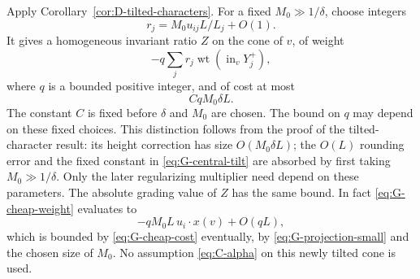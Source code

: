 Apply Corollary~\ref{cor:D-tilted-characters}.  For a fixed
$M_0\gg1/\delta$, choose integers
\begin{equation}\label{eq:G-rounding}
                r_j=M_0u_{ij}L/L_j+O(1).
\end{equation}
It gives a homogeneous invariant ratio $Z$ on the cone of $v$, of weight
\begin{equation}\label{eq:G-cheap-weight}
 -q\sum_jr_j\operatorname{wt}(\operatorname{in}_vY_j^+),
\end{equation}
where $q$ is a bounded positive integer, and of cost at most
\begin{equation}\label{eq:G-cheap-cost}
                              CqM_0\delta L.
\end{equation}
The constant $C$ is fixed before $\delta$ and $M_0$ are chosen.  The bound
on $q$ may depend on these fixed choices.  This distinction follows from
the proof of the tilted-character result: its height correction has
size $O(M_0\delta L)$; the $O(L)$ rounding error and the fixed constant in
\eqref{eq:G-central-tilt} are absorbed by first taking
$M_0\gg1/\delta$.  Only the later regularizing multiplier need depend
on these parameters.  The absolute grading value of $Z$ has the same
bound.  In fact \eqref{eq:G-cheap-weight} evaluates to
\[
 -qM_0L\,u_i\cdot x(v)+O(qL),
\]
which is bounded by \eqref{eq:G-cheap-cost} eventually, by
\eqref{eq:G-projection-small} and the chosen size of $M_0$.
No assumption \eqref{eq:C-alpha} on this newly tilted cone is used.

